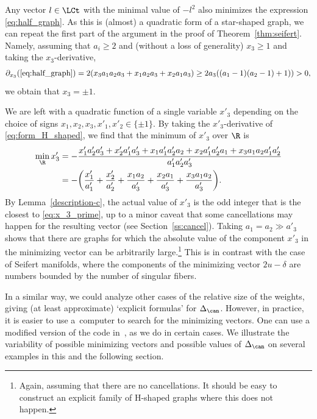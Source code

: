 \documentclass[10pt,a4paper]{amsart}
\begin{document}
Any vector $l \in \LCt$ with the minimal value of $-l^2$ also minimizes the expression \eqref{eq:half_graph}. As this is (almost) a quadratic form of a star-shaped graph, we can repeat the first part of the argument in the proof of Theorem~\ref{thm:seifert}. Namely, assuming that $a_i \geq 2$ and (without a loss of generality) $x_3 \geq 1$ and taking the $x_3$-derivative,{\samepage
\begin{align*}
\partial_{x_3}( \eqref{eq:half_graph}) = 2 (x_3 a_1 a_2 a_3 + x_1 a_2 a_3 + x_2 a_1 a_3)
 \geq 2 a_3( (a_1-1)(a_2-1) +1)) > 0,
\end{align*}
we obtain that $x_3 = \pm 1$.}

We are left with a quadratic function of a single variable $x'_3$ depending on the choice of signs $x_1,x_2,x_3,x'_1,x'_2 \in \{\pm 1\}$. By taking the $x'_3$-derivative of \eqref{eq:form_H_shaped}, we find that the minimum of $x'_3$ over $\R$ is
\begin{align}
 \min_{\R} x_3' &= -\frac{x'_1 a'_2 a'_3 + x'_2 a'_1 a'_3 + x_1 a'_1 a'_2 a_2 + x_2 a'_1 a'_2 a_1 + x_3 a_1 a_2 a'_1 a'_2}{a'_1 a'_2 a'_3} \nonumber\\
 &=-\biggl(\frac{x_1'}{a'_1}+\frac{x_2'}{a'_2}+\frac{x_1a_2}{a'_3}+\frac{x_2a_1}{a'_3}+\frac{x_3a_1 a_2}{a'_3}\biggr).\label{eq:x_3_prime}
\end{align}
By Lemma~\ref{description-c}, the actual value of $x'_3$ is the odd integer that is the closest to \eqref{eq:x_3_prime}, up to a minor caveat that some cancellations may happen for the resulting vector (see Section~\ref{ss:cancel}).
Taking $a_1=a_2 \gg a'_3$ shows that there are graphs for which the absolute value of the component $x'_3$ in the minimizing vector can be arbitrarily large.\footnote{Again, assuming that there are no cancellations. It should be easy to construct an explicit family of H-shaped graphs where this does not happen.} This is in contrast with the case of Seifert manifolds, where the components of the minimizing vector $2u-\delta$ are numbers bounded by the number of singular fibers.

In a similar way, we could analyze other cases of the relative size of the weights, giving (at least approximate) `explicit formulas' for $\Delta_{\can}$. However, in practice, it is easier to use a~computer to search for the minimizing vectors. One can use a modified version of the code in~\cite{petercode}, as we do in certain cases.
We illustrate the variability of possible minimizing vectors and possible values of $\Delta_{\can}$ on several examples in this and the following section.
\end{document}
